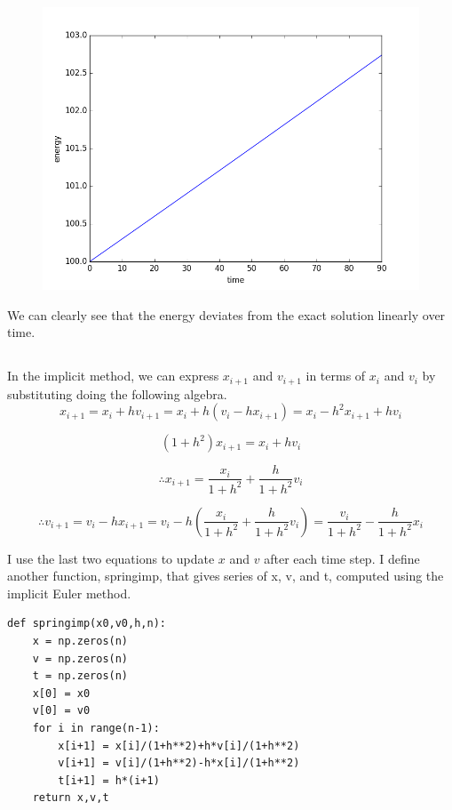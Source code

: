 \documentclass[10pt]{article}
\begin{document}
\begin{figure}[!h]
\centering
\includegraphics[scale=0.5]{w3fig6.png}
\end{figure}
We can clearly see that the energy deviates from the exact solution linearly over time.\\

\newpage
\subsection{}
In the implicit method, we can express $x_{i+1}$ and $v_{i+1}$ in terms of $x_{i}$ and $v_{i}$ by substituting doing the following algebra.\\

$$
x_{i+1} = x_i + h v_{i+1} = x_i + h (v_{i} - h x_{i+1}) = x_i - h^2 x_{i+1} + hv_i
$$

$$
(1+h^2) x_{i+1} = x_i + hv_i
$$

$$
\therefore x_{i+1} = \frac{x_i} {1+h^2} +\frac{h}{1+h^2} v_i
$$

$$
\therefore v_{i+1} = v_i - hx_{i+1} = v_i - h (\frac{x_i} {1+h^2} +\frac{h}{1+h^2} v_i) = \frac{v_i}{1+h^2} - \frac{h}{1+h^2} x_i
$$

I use the last two equations to update $x$ and $v$ after each time step. I define another function, springimp, that gives series of x, v, and t, computed using the implicit Euler method. \\
\begin{lstlisting}
def springimp(x0,v0,h,n):
    x = np.zeros(n)
    v = np.zeros(n)
    t = np.zeros(n)
    x[0] = x0
    v[0] = v0
    for i in range(n-1):
        x[i+1] = x[i]/(1+h**2)+h*v[i]/(1+h**2)
        v[i+1] = v[i]/(1+h**2)-h*x[i]/(1+h**2)
        t[i+1] = h*(i+1)
    return x,v,t
\end{lstlisting}
\end{document}
